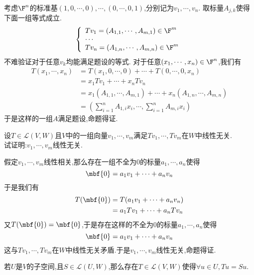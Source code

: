 \documentclass{ctexart}
\begin{document}
\begin{solution}[Proof.]
    考虑$\F^n$的标准基$(1,0,\cdots,0),\cdots,(0,\cdots,0,1)$,分别记为$v_1,\cdots,v_n$.
    取标量$A_{j,k}$使得下面一组等式成立.
    $$\left\{\begin{array}{l}
        \displaystyle Tv_1=(A_{1,1},\cdots,A_{m,1})\in\F^m \\
        \cdots\\
        \displaystyle Tv_n=(A_{1,n},\cdots,A_{m,n})\in\F^m \\
    \end{array}\right.$$
    不难验证对于任意$v_k$均能满足题设的等式.
    对于任意$(x_1,\cdots,x_n)\in\F^n$,我们有
    $$\begin{aligned}
        T(x_1,\cdots,x_n)
        &= T(x_1,0,\cdots,0)+\cdots+T(0,\cdots,0,x_n) \\
        &= x_1Tv_1+\cdots+x_nTv_n \\
        &= x_1(A_{1,1},\cdots,A_{m,1})+\cdots+x_n(A_{1,n},\cdots,A_{m,n}) \\
        &= \left(\sum_{i=1}^{n}A_{1,i}x_i,\cdots,\sum_{i=1}^{n}A_{m,i}x_i\right)
    \end{aligned}$$
    于是这样的一组$A$满足题设,命题得证.
\end{solution}
\begin{problem}[Example 2.]
    设$T\in\mathcal{L}(V,W)$且$V$中的一组向量$v_1,\cdots,v_m$满足$Tv_1,\cdots,Tv_m$在$W$中线性无关.\\
    试证明:$v_1,\cdots,v_m$线性无关.
\end{problem}
\begin{solution}[Proof.]
    假定$v_1,\cdots,v_m$线性相关,那么存在一组不全为$0$的标量$a_1,\cdots,a_n$使得
    $$\mbf{0}=a_1v_1+\cdots+a_nv_n$$
    于是我们有
    $$\begin{aligned}
        T(\mbf{0})
        &= T(a_1v_1+\cdots+a_nv_n) \\
        &= a_1Tv_1+\cdots+a_nTv_n
    \end{aligned}$$
    又$T(\mbf{0})=\mbf{0}$,于是存在这样的不全为$0$的标量$a_1,\cdots,a_n$使得
    $$\mbf{0}=a_1v_1+\cdots+a_nv_n$$
    这与$Tv_1,\cdots,Tv_m$在$W$中线性无关矛盾.于是$v_1,\cdots,v_m$线性无关,命题得证.
\end{solution}
\begin{problem}[Example 3.]
    若$U$是$V$的子空间,且$S\in\mathcal{L}(U,W)$,那么存在$T\in\mathcal{L}(V,W)$使得$\forall u\in U,Tu=Su$.
\end{problem}
\end{document}
